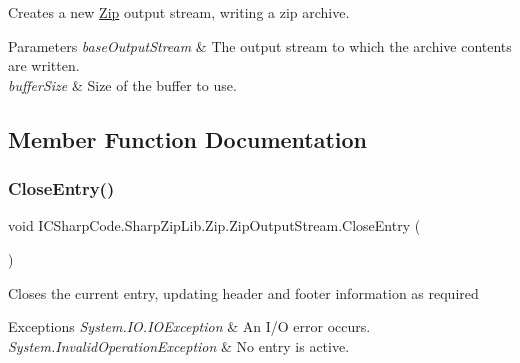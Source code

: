 Creates a new \hyperlink{namespace_i_c_sharp_code_1_1_sharp_zip_lib_1_1_zip}{Zip} output stream, writing a zip archive. 


\begin{DoxyParams}{Parameters}
{\em base\+Output\+Stream} & The output stream to which the archive contents are written.\\
\hline
{\em buffer\+Size} & Size of the buffer to use.\\
\hline
\end{DoxyParams}


\subsection{Member Function Documentation}
\mbox{\label{class_i_c_sharp_code_1_1_sharp_zip_lib_1_1_zip_1_1_zip_output_stream_afbc26f3bc0a0ae858e60f168714960ff}} 
\subsubsection{\texorpdfstring{Close\+Entry()}{CloseEntry()}}
{\footnotesize\ttfamily void I\+C\+Sharp\+Code.\+Sharp\+Zip\+Lib.\+Zip.\+Zip\+Output\+Stream.\+Close\+Entry (\begin{DoxyParamCaption}{ }\end{DoxyParamCaption})\hspace{0.3cm}{\ttfamily [inline]}}



Closes the current entry, updating header and footer information as required 


\begin{DoxyExceptions}{Exceptions}
{\em System.\+I\+O.\+I\+O\+Exception} & An I/O error occurs. \\
\hline
{\em System.\+Invalid\+Operation\+Exception} & No entry is active. \\
\hline
\end{DoxyExceptions}
\mbox{\label{class_i_c_sharp_code_1_1_sharp_zip_lib_1_1_zip_1_1_zip_output_stream_a4d08a1654b19d3ed90377c11c3459c94}} 
